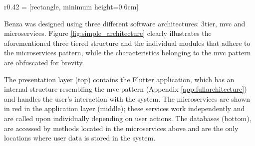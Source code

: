 \documentclass{article}
\begin{document}
    \begin{wrapfigure}{r}{0.42\textwidth}
        \vspace{-8pt}
         = [rectangle, minimum height=0.6cm]
        \caption{Benza's simplified architecture}
        \label{fig:simple_architecture}
        \vspace{-8pt} %
    \end{wrapfigure}
    
    Benza was designed using three different software architectures: \gls{3tier}, \acrfull{mvc} and \glspl{microservice}. Figure \ref{fig:simple_architecture} clearly illustrates the aforementioned three tiered structure and the individual modules that adhere to the \glspl{microservice} pattern, while the characteristics belonging to the \acrshort{mvc} pattern are obfuscated for brevity. \par
    
    The presentation layer (top) contains the Flutter application, which has an internal structure resembling the \acrshort{mvc} pattern (Appendix \ref{app:fullarchitecture}) and handles the user's interaction with the system. The microservices are shown in red in the application layer (middle); these services work independently and are called upon individually depending on user actions. The databases (bottom), are accessed by methods located in the microservices above and are the only locations where user data is stored in the system. \par
    
\end{document}
